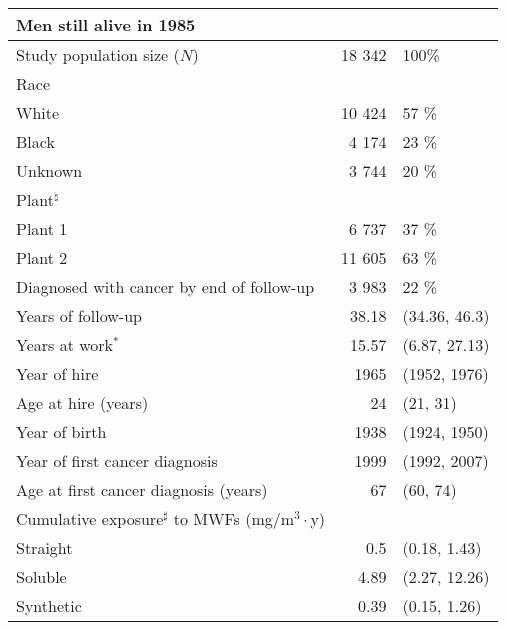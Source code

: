 \documentclass[10pt,]{article}
\begin{document}
\hypertarget{section-1}{%
\section{}\label{section-1}}

\begin{table}[H]
\centering
\begin{tabular}{lrl}
  \toprule
\multicolumn{3}{l}{Men still alive in 1985}\\%
  \midrule
Study population size ($N$) & 18 342 & 100\% \\ 
  Race &  &  \\ 
  \hspace{10pt}White & 10 424 & 57 \% \\ 
  \hspace{10pt}Black & 4 174 & 23 \% \\ 
  \hspace{10pt}Unknown & 3 744 & 20 \% \\ 
  Plant$^\natural$ &  &  \\ 
  \hspace{10pt}Plant 1 & 6 737 & 37 \% \\ 
  \hspace{10pt}Plant 2 & 11 605 & 63 \% \\ 
  Diagnosed with cancer by end of follow-up & 3 983 & 22 \% \\ 
  \hline Years of follow-up & 38.18 & (34.36, 46.3) \\ 
  Years at work$^*$ & 15.57 & (6.87, 27.13) \\ 
  Year of hire & 1965 & (1952, 1976) \\ 
  Age at hire (years) & 24 & (21, 31) \\ 
  Year of birth & 1938 & (1924, 1950) \\ 
  Year of first cancer diagnosis & 1999 & (1992, 2007) \\ 
  Age at first cancer diagnosis (years) & 67 & (60, 74) \\ 
  Cumulative exposure$^\sharp$ to MWFs (mg/m$^3\cdot$y) &  &  \\ 
  \hspace{10pt}Straight & 0.5 & (0.18, 1.43) \\ 
  \hspace{10pt}Soluble & 4.89 & (2.27, 12.26) \\ 
  \hspace{10pt}Synthetic & 0.39 & (0.15, 1.26) \\ 
   \bottomrule
\end{tabular}
\end{table}
\end{document}
